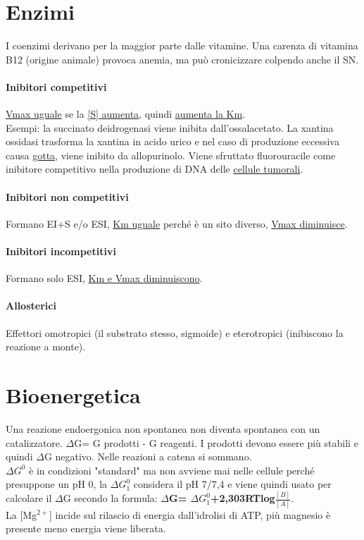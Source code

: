 \documentclass[10pt]{article}
\begin{document}
\section*{Enzimi}
I coenzimi derivano per la maggior parte dalle vitamine. Una carenza di vitamina B12 (origine animale) provoca anemia, ma può cronicizzare colpendo anche il SN.
\paragraph*{Inibitori competitivi}\underline{Vmax uguale} se la \underline{[S] aumenta},  quindi \underline{aumenta la Km}. \\Esempi: la succinato deidrogenasi viene inibita dall'ossalacetato. La xantina ossidasi trasforma la xantina in acido urico e nel caso di produzione eccessiva causa \underline{gotta}, viene inibito da allopurinolo. Viene sfruttato fluorouracile come inibitore competitivo nella produzione di DNA delle \underline{cellule tumorali}. 
\paragraph*{Inibitori non competitivi} Formano EI+S e/o ESI, \underline{Km uguale} perché è un sito diverso, \underline{Vmax diminuisce}.
\paragraph*{Inibitori incompetitivi} Formano solo ESI, \underline{Km e Vmax diminuiscono}.
\paragraph*{Allosterici}Effettori omotropici (il substrato stesso, sigmoide) e eterotropici (inibiscono la reazione a monte).
\section*{Bioenergetica}
Una reazione endoergonica non spontanea non diventa spontanea con un catalizzatore. $\Delta$G= G prodotti - G reagenti. I prodotti devono essere più stabili e quindi $\Delta$G negativo. Nelle reazioni a catena si sommano.\\
$\Delta G^0$ è in condizioni "standard" ma non avviene mai nelle cellule perché presuppone un pH 0, la $\Delta G^0_1$ considera il pH 7/7,4 e viene quindi usato per calcolare il $\Delta$G secondo la formula: \textbf{$\Delta$G= $\Delta G^0_1$+2,303RTlog$\frac{[B]}{[A]}$}.\\
La [Mg$^{2+}$] incide sul rilascio di energia dall'idrolisi di ATP, più magnesio è presente meno energia viene liberata.
\end{document}
